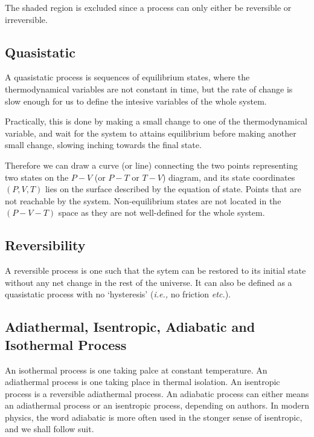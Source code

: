 \documentclass[english,a4paper,12pt]{report}
\begin{document}
The shaded region is excluded since a process can only either be reversible or irreversible.


\subsection{Quasistatic}

A quasistatic process is sequences of equilibrium states, where the thermodynamical variables are not constant in time, but the rate of change is slow enough for us to define the intesive variables of the whole system. 

Practically, this is done by making a small change to one of the thermodynamical variable, and wait for the system to attains equilibrium before making another small change, slowing inching towards the final state.

Therefore we can draw a curve (or line) connecting the two points representing two states on the \(P-V\) (or \(P-T\) or \(T-V\)) diagram, and its state coordinates \((P,V,T)\) lies on the surface described by the equation of state. Points that are not reachable by the system. Non-equilibrium states are not located in the \((P-V-T)\) space as they are not well-defined for the whole system. 

\subsection{Reversibility}

A reversible process is one such that the sytem can be restored to its initial state without any net change in the rest of the universe. It can also be defined as a quasistatic process with no `hysteresis' (\textit{i.e.,} no friction \textit{etc.}).

\subsection{Adiathermal, Isentropic, Adiabatic and Isothermal Process}

An isothermal process is one taking palce at constant temperature. An adiathermal process is one taking place in thermal isolation. An isentropic process is a reversible adiathermal process. An adiabatic process can either means an adiathermal process or an isentropic process, depending on authors. In modern physics, the word adiabatic is more often used in the stonger sense of isentropic, and we shall follow suit.
\end{document}
